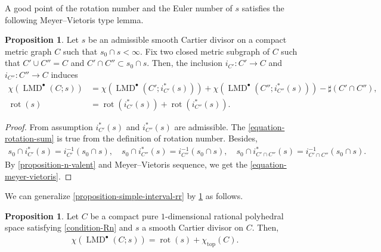 \documentclass[a4paper,dvipdfmx,reqno,12pt]{amsart}
\theoremstyle{definition}
\newtheorem{proposition}[theorem]{Proposition}
\newcommand{\opn}[1]{\operatorname{#1}}
\numberwithin{equation}{section}
\begin{document}
A good point of the rotation number and the 
Euler number of $s$ satisfies the 
following Meyer--Vietoris type lemma.

\begin{proposition}
\label{proposition-gluing-formula}
Let $s$ be an admissible smooth Cartier divisor on a
compact metric graph $C$ such that $s_0\cap s<\infty$.
Fix two closed metric subgraph of $C$ such that
$C' \cup C''=C$ and $C'\cap C''\subset s_0 \cap s$.
Then, 
the inclusion $i_{C'}\colon C'\to C$ 
and $i_{C''}\colon C''\to C$ induces
\begin{align}
\label{equation-meyer-vietoris}
\chi(\opn{LMD}^{\bullet}(C;s))
&=\chi(\opn{LMD}^{\bullet}(C';i_{C'}^{*}(s)))
+\chi(\opn{LMD}^{\bullet}(C'';i_{C''}^{*}(s)))
-\sharp(C'\cap C''), \\
\label{equation-rotation-sum}
\opn{rot}(s)&=\opn{rot}(i_{C'}^{*}(s))
+\opn{rot}(i_{C''}^{*}(s)).
\end{align}
\end{proposition}
\begin{proof}
From assumption $i^{*}_{C'}(s)$ and 
$i^{*}_{C''}(s)$ are admissible.
The \cref{equation-rotation-sum} is true from
the definition of rotation number. 
 Besides,
\begin{align}
s_0\cap i^{*}_{C'}(s)=i^{-1}_{C'}(s_0\cap s), \quad 
s_0\cap i^{*}_{C''}(s)=i^{-1}_{C''}(s_0\cap s), \quad
s_0\cap i^{*}_{C'\cap C''}(s)=
i^{-1}_{C'\cap C''}(s_0\cap s).
\end{align}
By \cref{proposition-n-valent} 
and Meyer--Vietoris sequence, we get 
the \cref{equation-meyer-vietoris}.
\end{proof}

We can generalize
\cref{proposition-simple-interval-rr} by
\cref{proposition-gluing-formula} as follows.

\begin{proposition}
\label{proposition-MRR-1-dim-poly-space}
Let $C$ be a compact pure $1$-dimensional rational 
polyhedral space satisfying \cref{condition-Rn} 
and $s$ a smooth Cartier divisor on $C$. Then,
\begin{align}
\chi(\opn{LMD}^{\bullet}(C;s))=\opn{rot}(s)+
\chi_{\opn{top}}(C).
\end{align}
\end{proposition}
\end{document}
